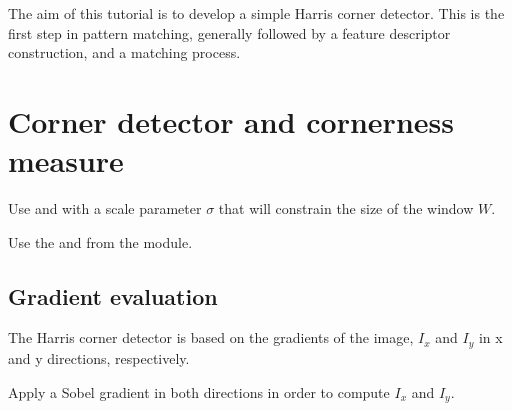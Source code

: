 \def\difficulty{1}
\begin{note}The aim of this tutorial is to develop a simple Harris corner detector. This is the first step in pattern matching, generally followed by a feature descriptor construction, and a matching process.\end{note}

\vspace*{-10pt}

\section{Corner detector and cornerness measure}

\vspace*{-10pt}

\begin{mcomment}
\begin{mremark}
 Use  and  with a scale parameter $\sigma$ that will constrain the size of the window $W$.
\end{mremark}
\end{mcomment}

\begin{pcomment}
\begin{premark}
 Use the  and  from the  module.
\end{premark}
\end{pcomment}

\vspace*{-3pt}

\subsection{Gradient evaluation}

The Harris corner detector is based on the gradients of the image, $I_x$ and $I_y$ in x and y directions, respectively.

\begin{qbox}
 Apply a Sobel gradient in both directions in order to compute $I_x$ and $I_y$.
\end{qbox}


